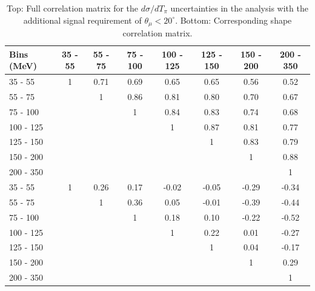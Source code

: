 \begingroup
\squeezetable
\begin{table}[h]
\begin{tabular}{l|ccccccc}
\hline\hline
Bins (MeV) & 35 - 55 & 55 - 75 & 75 - 100 & 100 - 125 & 125 - 150 & 150 - 200 & 200 - 350 \\ 
\hline
35 - 55 & 1 & 0.71 & 0.69 & 0.65 & 0.65 & 0.56 & 0.52 \\ 
55 - 75 &  & 1 & 0.86 & 0.81 & 0.80 & 0.70 & 0.67 \\ 
75 - 100 &  &  & 1 & 0.84 & 0.83 & 0.74 & 0.68 \\ 
100 - 125 &  &  &  & 1 & 0.87 & 0.81 & 0.77 \\ 
125 - 150 &  &  &  &  & 1 & 0.83 & 0.79 \\ 
150 - 200 &  &  &  &  &  & 1 & 0.88 \\ 
200 - 350 &  &  &  &  &  &  & 1 \\
\hline
35 - 55 & 1 & 0.26 & 0.17 & -0.02 & -0.05 & -0.29 & -0.34 \\ 
55 - 75 &  & 1 & 0.36 & 0.05 & -0.01 & -0.39 & -0.44 \\ 
75 - 100 &  &  & 1 & 0.18 & 0.10 & -0.22 & -0.52 \\ 
100 - 125 &  &  &  & 1 & 0.22 & 0.01 & -0.27 \\ 
125 - 150 &  &  &  &  & 1 & 0.04 & -0.17 \\ 
150 - 200 &  &  &  &  &  & 1 & 0.29 \\ 
200 - 350 &  &  &  &  &  &  & 1 \\ 
\hline\hline
\end{tabular}
\caption{Top: Full correlation matrix for the $d\sigma / dT_\pi$ uncertainties in the \cconepi analysis with the additional signal requirement of $\theta_\mu < 20^\circ$.  Bottom: Corresponding shape correlation matrix.}
\end{table}
\endgroup

